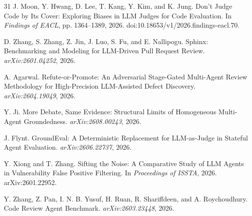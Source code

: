 \documentclass[acmsmall,screen,review,anonymous]{acmart}
\begin{document}
\begin{thebibliography}{31}
J. Moon, Y. Hwang, D. Lee, T. Kang, Y. Kim, and K. Jung. Don't Judge Code by Its Cover: Exploring Biases in LLM Judges for Code Evaluation. In \emph{Findings of EACL}, pp. 1364--1389, 2026. doi:10.18653/v1/2026.findings-eacl.70.

D. Zhang, S. Zhang, Z. Jin, J. Luo, S. Fu, and E. Nallipogu. Sphinx: Benchmarking and Modeling for LLM-Driven Pull Request Review. \emph{arXiv:2601.04252}, 2026.

A. Agarwal. Refute-or-Promote: An Adversarial Stage-Gated Multi-Agent Review Methodology for High-Precision LLM-Assisted Defect Discovery. \emph{arXiv:2604.19049}, 2026.

Y. Ji. More Debate, Same Evidence: Structural Limits of Homogeneous Multi-Agent Groundedness. \emph{arXiv:2608.00243}, 2026.

J. Flynt. GroundEval: A Deterministic Replacement for LLM-as-Judge in Stateful Agent Evaluation. \emph{arXiv:2606.22737}, 2026.

Y. Xiong and T. Zhang. Sifting the Noise: A Comparative Study of LLM Agents in Vulnerability False Positive Filtering. In \emph{Proceedings of ISSTA}, 2026. arXiv:2601.22952.

Y. Zhang, Z. Pan, I. N. B. Yusuf, H. Ruan, R. Shariffdeen, and A. Roychoudhury. Code Review Agent Benchmark. \emph{arXiv:2603.23448}, 2026.
\end{thebibliography}
\end{document}
